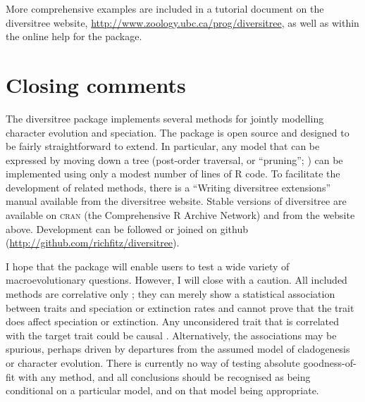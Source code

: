 \documentclass[12pt]{article}
\begin{document}
More comprehensive examples are included in a tutorial document on the
diversitree website, \url{http://www.zoology.ubc.ca/prog/diversitree},
as well as within the online help for the package.

\section{Closing comments}

The diversitree package implements several methods for jointly
modelling character evolution and speciation.
%
The package is open source and designed to be fairly straightforward
to extend.  In particular, any model that can be expressed by moving
down a tree (post-order traversal, or ``pruning'';
\citealp{Felsenstein-1981-368}) can be implemented using only a modest
number of lines of R code.  To facilitate the development of related
methods, there is a ``Writing diversitree extensions'' manual
available from the diversitree website.
%
Stable versions of diversitree are available on \textsc{cran} (the
Comprehensive R Archive Network) and from the website above.
%
Development can be followed or joined on github
(\url{http://github.com/richfitz/diversitree}).

I hope that the package will enable users to test a wide variety of
macroevolutionary questions.
%
However, I will close with a caution.  All included methods are
correlative only \citep{Maddison-2007-701,Losos-2011-709}; they can
merely show a statistical association between traits and speciation or
extinction rates and cannot prove that the trait does affect
speciation or extinction.  Any unconsidered trait that is correlated
with the target trait could be causal \citep[and Figure
\ref{fig:musse-power}]{Maddison-2007-701}.
%
Alternatively, the associations may be spurious, perhaps driven by
departures from the assumed model of cladogenesis or character
evolution.  There is currently no way of testing absolute
goodness-of-fit with any method, and all conclusions should be
recognised as being conditional on a particular model, and on that
model being appropriate.

\end{document}
